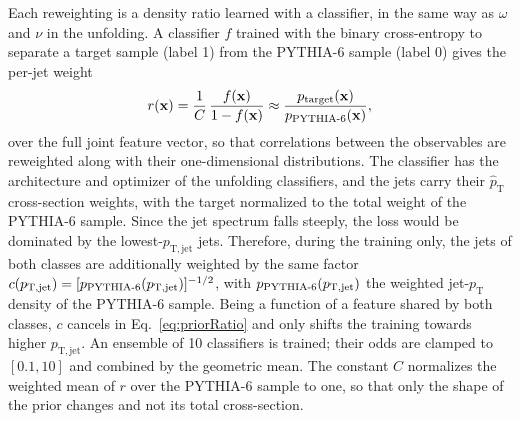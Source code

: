  Each reweighting is a density ratio learned with a classifier, in the same way as \(\omega\) and \(\nu\) in the unfolding.
 A classifier \(f\) trained with the binary cross-entropy to separate a target sample (label 1) from the PYTHIA\mbox{-}6 sample (label 0) gives the per-jet weight
 \begin{equation}
 	\label{eq:priorRatio}
 	r(\mathbf{x}) = \frac{1}{C}\,\frac{f(\mathbf{x})}{1 - f(\mathbf{x})} \approx \frac{p_\mathrm{target}(\mathbf{x})}{p_\text{PYTHIA\mbox{-}6}(\mathbf{x})} ,
 \end{equation}
 over the full joint feature vector, so that correlations between the observables are reweighted along with their one-dimensional distributions.
 The classifier has the architecture and optimizer of the unfolding classifiers, and the jets carry their \(\hat{p}_\mathrm{T}\) cross-section weights, with the target normalized to the total weight of the PYTHIA\mbox{-}6 sample.
 Since the jet spectrum falls steeply, the loss would be dominated by the lowest-\(p_\mathrm{T, jet}\) jets.
 Therefore, during the training only, the jets of both classes are additionally weighted by the same factor \(c(p_\mathrm{T, jet}) = [p_\text{PYTHIA\mbox{-}6}(p_\mathrm{T, jet})]^{-1/2}\), with \(p_\text{PYTHIA\mbox{-}6}(p_\mathrm{T, jet})\) the weighted jet-\(p_\mathrm{T}\) density of the PYTHIA\mbox{-}6 sample.
 Being a function of a feature shared by both classes, \(c\) cancels in Eq.~\ref{eq:priorRatio} and only shifts the training towards higher \(p_\mathrm{T, jet}\).
 An ensemble of 10 classifiers is trained; their odds are clamped to \([0.1, 10]\) and combined by the geometric mean.
 The constant \(C\) normalizes the weighted mean of \(r\) over the PYTHIA\mbox{-}6 sample to one, so that only the shape of the prior changes and not its total cross-section.

